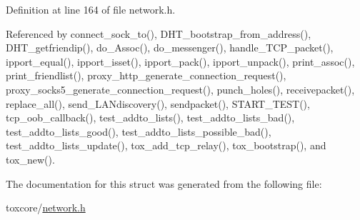 Definition at line 164 of file network.\+h.



Referenced by connect\+\_\+sock\+\_\+to(), D\+H\+T\+\_\+bootstrap\+\_\+from\+\_\+address(), D\+H\+T\+\_\+getfriendip(), do\+\_\+\+Assoc(), do\+\_\+messenger(), handle\+\_\+\+T\+C\+P\+\_\+packet(), ipport\+\_\+equal(), ipport\+\_\+isset(), ipport\+\_\+pack(), ipport\+\_\+unpack(), print\+\_\+assoc(), print\+\_\+friendlist(), proxy\+\_\+http\+\_\+generate\+\_\+connection\+\_\+request(), proxy\+\_\+socks5\+\_\+generate\+\_\+connection\+\_\+request(), punch\+\_\+holes(), receivepacket(), replace\+\_\+all(), send\+\_\+\+L\+A\+Ndiscovery(), sendpacket(), S\+T\+A\+R\+T\+\_\+\+T\+E\+S\+T(), tcp\+\_\+oob\+\_\+callback(), test\+\_\+addto\+\_\+lists(), test\+\_\+addto\+\_\+lists\+\_\+bad(), test\+\_\+addto\+\_\+lists\+\_\+good(), test\+\_\+addto\+\_\+lists\+\_\+possible\+\_\+bad(), test\+\_\+addto\+\_\+lists\+\_\+update(), tox\+\_\+add\+\_\+tcp\+\_\+relay(), tox\+\_\+bootstrap(), and tox\+\_\+new().



The documentation for this struct was generated from the following file\+:\begin{DoxyCompactItemize}
\item 
toxcore/\hyperlink{network_8h}{network.\+h}\end{DoxyCompactItemize}
